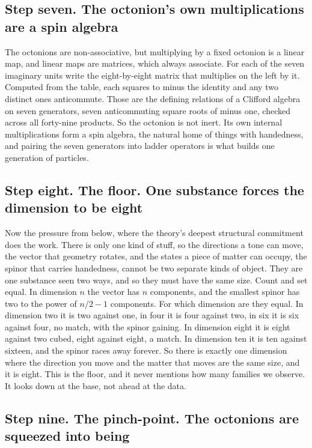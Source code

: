 \subsection*{Step seven. The octonion's own multiplications are a spin algebra}

The octonions are non-associative, but multiplying by a fixed octonion is a linear map, and linear maps are matrices, which always associate. For each of the seven imaginary units write the eight-by-eight matrix that multiplies on the left by it. Computed from the table, each squares to minus the identity and any two distinct ones anticommute. Those are the defining relations of a Clifford algebra on seven generators, seven anticommuting square roots of minus one, checked across all forty-nine products. So the octonion is not inert. Its own internal multiplications form a spin algebra, the natural home of things with handedness, and pairing the seven generators into ladder operators is what builds one generation of particles.

\subsection*{Step eight. The floor. One substance forces the dimension to be eight}

Now the pressure from below, where the theory's deepest structural commitment does the work. There is only one kind of stuff, so the directions a tone can move, the vector that geometry rotates, and the states a piece of matter can occupy, the spinor that carries handedness, cannot be two separate kinds of object. They are one substance seen two ways, and so they must have the same size. Count and set equal. In dimension $n$ the vector has $n$ components, and the smallest spinor has two to the power of $n/2 - 1$ components. For which dimension are they equal. In dimension two it is two against one, in four it is four against two, in six it is six against four, no match, with the spinor gaining. In dimension eight it is eight against two cubed, eight against eight, a match. In dimension ten it is ten against sixteen, and the spinor races away forever. So there is exactly one dimension where the direction you move and the matter that moves are the same size, and it is eight. This is the floor, and it never mentions how many families we observe. It looks down at the base, not ahead at the data.

\subsection*{Step nine. The pinch-point. The octonions are squeezed into being}

